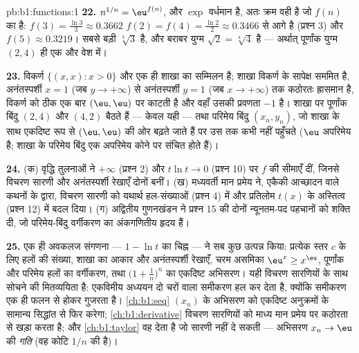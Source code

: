 \begin{solution}{pb:b1:functions:1}
\textbf{22.} $n^{1/n} = \eu^{f(n)}$, और $\exp$ वर्धमान है, अतः क्रम वही है
जो $f(n)$ का है: $f(3) = \frac{\ln3}3 \approx 0.3662$ $f(2) = f(4) =
\frac{\ln2}2 \approx 0.3466$ से आगे है (प्रश्न 3) और $f(5) \approx 0.3219$।
सबसे बड़ी $\sqrt[3]3$ है, और बराबर युग्म $\sqrt2 = \sqrt[4]4$ है --- अर्थात्
पूर्णांक युग्म $(2, 4)$ ही एक और वेश में।

\textbf{23.}  विकर्ण $\{(x, x) : x > 0\}$ और एक ही शाखा का सम्मिलन
है; शाखा विकर्ण के सापेक्ष सममित है, अनंतस्पर्शी $x = 1$ (जब $y \to
+\infty$) से अनंतस्पर्शी $y = 1$ (जब $x \to +\infty$) तक कठोरतः ह्रासमान है,
विकर्ण को ठीक एक बार $(\eu, \eu)$ पर काटती है और वहाँ उसकी प्रवणता $-1$ है।
शाखा पर पूर्णांक बिंदु $(2, 4)$ और $(4, 2)$ बैठते हैं --- केवल यही --- तथा
परिमेय बिंदु $(x_n, y_n)$, जो शाखा के साथ एकदिष्ट रूप से $(\eu, \eu)$ की ओर
बढ़ते जाते हैं पर उस तक कभी नहीं पहुँचते ($\eu$ अपरिमेय है; शाखा के परिमेय
बिंदु एक अपरिमेय कोने पर संचित होते हैं)।

\textbf{24.} (क) वृद्धि तुलनाओं ने $+\infty$ (प्रश्न 2) और $t\ln t \to 0$
(प्रश्न 10) पर $f$ की सीमाएँ दीं, जिनसे विचरण सारणी और अनंतस्पर्शी रेखाएँ
दोनों बनीं। (ख) मध्यवर्ती मान प्रमेय ने, एकैकी आच्छादन वाले कथनों के द्वारा,
विचरण सारणी को यथार्थ हल-संख्याओं (प्रश्न 4) में और प्रतिलोम 
$t(x)$ के अस्तित्व (प्रश्न 12) में बदल दिया। (ग) अद्वितीय गुणनखंडन ने प्रश्न
15 की दोनों न्यूनतम-पद पहचानों को शक्ति दी, जो परिमेय-बिंदु वर्गीकरण का
अंकगणितीय हृदय हैं।

\textbf{25.} एक ही अवकलज संगणना --- $1 - \ln t$ का चिह्न --- ने सब कुछ
उत्पन्न किया: प्रत्येक स्तर $c$ के लिए हलों की संख्या, शाखा का आकार और
अनंतस्पर्शी रेखाएँ, चरम असमिका $\eu^x \geq x^\eu$, पूर्णांक और परिमेय हलों
का वर्गीकरण, तथा $\bigl(1 + \frac1n\bigr)^n$ का एकदिष्ट अभिसरण। यही विचरण
सारणियों के साथ सोचने की मितव्ययिता है: एकविमीय अध्ययन दो चरों वाला समीकरण
हल कर देता है, क्योंकि समीकरण एक ही फलन से होकर गुजरता है। \cref{ch:b1:seq}
$(x_n)$ के अभिसरण को एकदिष्ट अनुक्रमों के सामान्य सिद्धांत से फिर करेगा;
\cref{ch:b1:derivative} विचरण सारणियों को माध्य मान प्रमेय पर कठोरता से खड़ा
करता है; और \cref{ch:b1:taylor} वह देता है जो सारणी नहीं दे सकती --- अभिसरण
$x_n \to \eu$ की \emph{गति} (वह कोटि $1/n$ की है)।
\end{solution}
